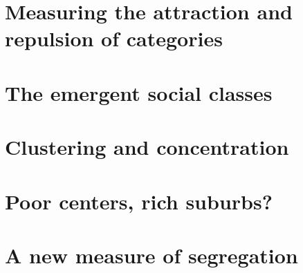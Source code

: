 \section{Measuring the attraction and repulsion of categories}
\label{sec:measuring_the_attraction_and_repulsion_of_categories}

\section{The emergent social classes}
\label{sec:the_emergent_social_classes}

\section{Clustering and concentration}
\label{sec:clustering_and_concentration}

\section{Poor centers, rich suburbs?}
\label{sec:poor_centers_rich_suburbs_}

\section{A new measure of segregation}
\label{sec:a_new_measure_of_segregation}
